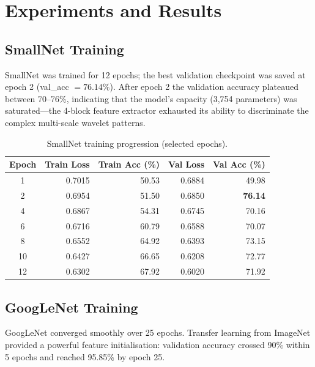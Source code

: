 \documentclass[12pt,a4paper]{article}
\begin{document}
\section{Experiments and Results}

\subsection{SmallNet Training}

SmallNet was trained for 12 epochs; the best validation checkpoint was saved at
epoch 2 (val\_acc $= 76.14\%$).  After epoch 2 the validation accuracy
plateaued between 70--76\%, indicating that the model's capacity (3,754
parameters) was saturated---the 4-block feature extractor exhausted its ability
to discriminate the complex multi-scale wavelet patterns.

\begin{table}[H]
\centering
\caption{SmallNet training progression (selected epochs).}
\label{tab:smallnet_hist}
\begin{tabular}{crrrr}
    \toprule
    \textbf{Epoch} & \textbf{Train Loss} & \textbf{Train Acc (\%)} &
    \textbf{Val Loss} & \textbf{Val Acc (\%)} \\
    \midrule
    1  & 0.7015 & 50.53 & 0.6884 & 49.98 \\
    2  & 0.6954 & 51.50 & 0.6850 & \textbf{76.14} \\
    4  & 0.6867 & 54.31 & 0.6745 & 70.16 \\
    6  & 0.6716 & 60.79 & 0.6588 & 70.07 \\
    8  & 0.6552 & 64.92 & 0.6393 & 73.15 \\
    10 & 0.6427 & 66.65 & 0.6208 & 72.77 \\
    12 & 0.6302 & 67.92 & 0.6020 & 71.92 \\
    \bottomrule
\end{tabular}
\end{table}

\subsection{GoogLeNet Training}

GoogLeNet converged smoothly over 25 epochs.  Transfer learning from ImageNet
provided a powerful feature initialisation: validation accuracy crossed 90\%
within 5 epochs and reached 95.85\% by epoch 25.
\end{document}
